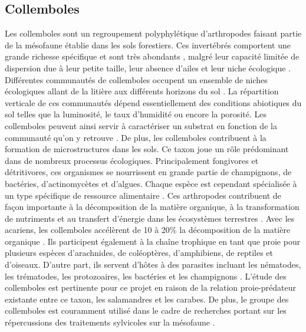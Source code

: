 \subsection*{Collemboles}

Les collemboles sont un regroupement polyphylétique d'arthropodes faisant partie de la mésofaune établie dans les sols forestiers.
Ces invertébrés comportent une grande richesse spécifique et sont très abondants \citep{rusekBiodiversityCollembolaTheir1998}, 
malgré leur capacité limitée de dispersion due à leur petite taille, leur absence d’ailes et leur niche écologique \citep{Ojala2001Dispersalmicroarthropods}.
Différentes communautés de collemboles occupent un ensemble de niches écologiques allant de la litière aux différents horizons du sol \citep{pongeVerticalDistributionCollembola2000}.
La répartition verticale de ces communautés dépend essentiellement des conditions abiotiques du sol telles que la luminosité, le taux d’humidité ou encore la porosité.
Les collemboles peuvent ainsi servir à caractériser un substrat en fonction de la communauté qu’on y retrouve \citep{rusekBiodiversityCollembolaTheir1998}.
De plus, les collemboles contribuent à la formation de microstructures dans les sols. 
Ce taxon joue un rôle prédominant dans de nombreux processus écologiques. 
Principalement fongivores et détritivores, ces organismes se nourrissent en grande partie de champignons, de bactéries, d'actinomycètes et d'algues. 
Chaque espèce est cependant spécialisée à un type spécifique de ressource alimentaire \citep{Chen1995Foodpreference,rusekBiodiversityCollembolaTheir1998}.
Ces arthropodes contribuent de façon importante à la décomposition de la matière organique, à la transformation de nutriments et 
au transfert d’énergie dans les écosystèmes terrestres \citep{rusekBiodiversityCollembolaTheir1998,Hattenschwiler2005Biodiversitylitter,Cuchta2019importantrole,Marsden2020Howagroforestry}.
Avec les acariens, les collemboles accélèrent de 10 à 20\% la décomposition de la matière organique \citep{Hattenschwiler2005Biodiversitylitter}.
Ils participent également à la chaîne trophique en tant que proie pour plusieurs espèces d’arachnides, de coléoptères, d’amphibiens, de reptiles et d’oiseaux. 
D’autre part, ils servent d’hôtes à des parasites incluant les nématodes, les trématodes, les protozoaires, les bactéries et les champignons \citep{rusekBiodiversityCollembolaTheir1998}.
L'étude des collemboles est pertinente pour ce projet en raison de la relation proie-prédateur existante entre ce taxon, les salamandres et les carabes. 
De plus, le groupe des collemboles est couramment utilisé dans le cadre de recherches portant sur les répercussions des traitements sylvicoles sur la mésofaune \citep{Salmon2008Relationshipssoil,farskaManagementIntensityAffects2014,rousseauWoodyBiomassRemoval2019}.


